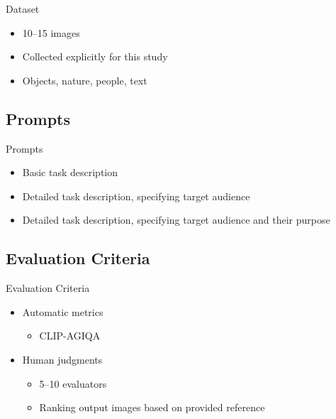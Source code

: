 \documentclass[aspectratio=169,xcolor=dvipsnames]{beamer}
\begin{document}
\begin{frame}{Dataset}
    \begin{itemize}
        \item 10--15 images
        \item Collected explicitly for this study
        \item Objects, nature, people, text
    \end{itemize}
\end{frame}

\subsection{Prompts}

\begin{frame}{Prompts}
    \begin{itemize}
        \item Basic task description 
        \item Detailed task description, specifying target audience
        \item Detailed task description, specifying target audience and their purpose
    \end{itemize}
\end{frame}

\subsection{Evaluation Criteria}

\begin{frame}{Evaluation Criteria}
    \begin{itemize}
        \item Automatic metrics
        \begin{itemize}
            \item CLIP-AGIQA
        \end{itemize}
        \item Human judgments
        \begin{itemize}
            \item 5--10 evaluators
            \item Ranking output images based on provided reference 
        \end{itemize}
    \end{itemize}
\end{frame}
\end{document}
